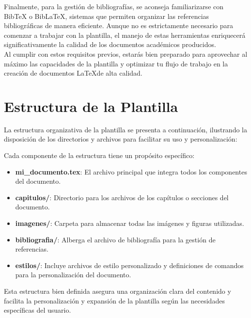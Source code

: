 \documentclass[11pt]{article}
\begin{document}
Finalmente, para la gestión de bibliografías, se aconseja familiarizarse con BibTeX o BibLaTeX, sistemas que permiten organizar las referencias bibliográficas de manera eficiente. Aunque no es estrictamente necesario para comenzar a trabajar con la plantilla, el manejo de estas herramientas enriquecerá significativamente la calidad de los documentos académicos producidos.\\

Al cumplir con estos requisitos previos, estarás bien preparado para aprovechar al máximo las capacidades de la plantilla y optimizar tu flujo de trabajo en la creación de documentos \LaTeX de alta calidad.

\section{Estructura de la Plantilla}
La estructura organizativa de la plantilla se presenta a continuación, ilustrando la disposición de los directorios y archivos para facilitar su uso y personalización:


Cada componente de la estructura tiene un propósito específico:
\begin{itemize}
    \item \textbf{mi\_documento.tex}: El archivo principal que integra todos los componentes del documento.
    \item \textbf{capitulos/}: Directorio para los archivos de los capítulos o secciones del documento.
    \item \textbf{imagenes/}: Carpeta para almacenar todas las imágenes y figuras utilizadas.
    \item \textbf{bibliografia/}: Alberga el archivo de bibliografía para la gestión de referencias.
    \item \textbf{estilos/}: Incluye archivos de estilo personalizado y definiciones de comandos para la personalización del documento.
\end{itemize}

Esta estructura bien definida asegura una organización clara del contenido y facilita la personalización y expansión de la plantilla según las necesidades específicas del usuario.
\end{document}
